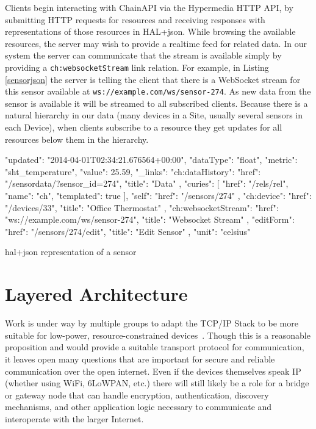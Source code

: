 \documentclass{acm_proc_article-sp}
\begin{document}
Clients begin interacting with ChainAPI via the Hypermedia HTTP API, by submitting
HTTP requests for resources and receiving responses with representations of
those resources in HAL+json. While browsing the available resources, the server
may wish to provide a realtime feed for related data. In our system the server
can communicate that the stream is available simply by providing a
\texttt{ch:websocketStream} link relation. For example, in Listing
\ref{sensorjson} the server is telling the client that there is a WebSocket
stream for this sensor available at \texttt{ws://example.com/ws/sensor-274}. As
new data from the sensor is available it will be streamed to all subscribed
clients. Because there is a natural hierarchy in our data (many devices in a
Site, usually several sensors in each Device), when clients subscribe to a resource
they get updates for all resources below them in the hierarchy.

\begin{listing}
\begin{jsoncode}
  {
    "updated": "2014-04-01T02:34:21.676564+00:00",
    "dataType": "float",
    "metric": "sht_temperature",
    "value": 25.59,
    "_links": {
      "ch:dataHistory": {
        "href": "/sensordata/?sensor_id=274",
        "title": "Data"
      },
      "curies": [
        {
          "href": "/rels/{rel}",
          "name": "ch",
          "templated": true
        }
      ],
      "self": {
        "href": "/sensors/274"
      },
      "ch:device": {
        "href": "/devices/33",
        "title": "Office Thermostat"
      },
      "ch:websocketStream": {
        "href": "ws://example.com/ws/sensor-274",
        "title": "Websocket Stream"
      },
      "editForm": {
        "href": "/sensors/274/edit",
        "title": "Edit Sensor"
      }
    },
    "unit": "celsius"
  }
\end{jsoncode}
\caption{hal+json representation of a sensor}
\label{sensorjson}
\end{listing}


\section{Layered Architecture}

Work is under way by multiple groups to adapt the TCP/IP Stack to be more
suitable for low-power, resource-constrained devices~\cite{iotsurvey}. Though
this is a reasonable proposition and would provide a suitable transport
protocol for communication, it leaves open many questions that are important
for secure and reliable communication over the open internet. Even if the
devices themselves speak IP (whether using WiFi, 6LoWPAN, etc.) there will
still likely be a role for a bridge or gateway node that can handle encryption,
authentication, discovery mechanisms, and other application logic necessary to
communicate and interoperate with the larger Internet.
\end{document}
